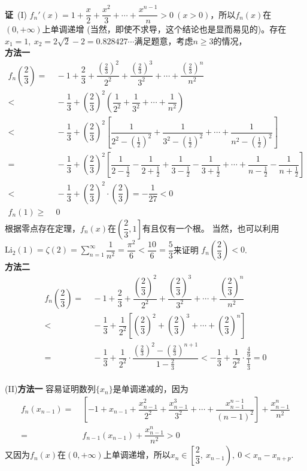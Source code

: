 \begin{enumerate}[label={【\textbf{例\thechapter.\arabic*}】},
 leftmargin=\inteval{\myenumleftmargin}pt,
 itemsep=\inteval{\myenumitempsep}pt,
 itemindent=\inteval{\myenumitemindent}pt]
\textbf{证}\ (I) $ f_n'(x)=1+\dfrac{x}{2}+\dfrac{x^2}{3}+\cdots
+\dfrac{x^{n-1}}{n}>0\ (x>0) $，所以$ f_n(x) $在$ (0,+\infty) $上单调递增
(当然，即使不求导，这个结论也是显而易见的)。存在$ x_1=1,\ 
x_2=2\sqrt{2}-2=0.828427\cdots $满足题意，考虑$ n\geq 3 $的情况，\\
\textbf{方法一}
\begin{align*}
    f_n\left(\dfrac{2}{3}\right)=&\ -1+\dfrac{2}{3}+\dfrac{(\frac{2}{3})^2}{2^2}
    +\dfrac{(\frac{2}{3})^3}{3^2}+\cdots+\dfrac{(\frac{2}{3})^n}{n^2} \\
    <&\ -\dfrac{1}{3}+\left(\dfrac{2}{3}\right)^2\left(\dfrac{1}{2^2}+
    \dfrac{1}{3^2}+\cdots+\dfrac{1}{n^2}\right) \\
    <&\ -\dfrac{1}{3}+\left(\dfrac{2}{3}\right)^2\left[\dfrac{1}{2^2-
        (\frac{1}{2})^2}+\dfrac{1}{3^2-(\frac{1}{2})^2}+\cdots+
    \dfrac{1}{n^2-(\frac{1}{2})^2}\right] \\
    =&\ -\dfrac{1}{3}+\left(\dfrac{2}{3}\right)^2\left[\dfrac{1}{2-
        \frac{1}{2}}-\dfrac{1}{2+\frac{1}{2}}+\dfrac{1}{3-\frac{1}{2}}-
    \dfrac{1}{3+\frac{1}{2}}+\cdots+\dfrac{1}{n-\frac{1}{2}}-
    \dfrac{1}{n+\frac{1}{2}} \right] \\  
    <&\ -\dfrac{1}{3}+\left(\dfrac{2}{3}\right)^2\cdot \left(\dfrac{2}{3}\right)
    =-\dfrac{1}{27}<0 \\
    f_n(1)\geq &\ 0
\end{align*}
根据零点存在定理，$ f_n(x) $在$ \left(\dfrac{2}{3},1\right] $有且仅有一个根。
当然，也可以利用$ \mathrm{Li}_2(1)=\zeta(2)=\sum\limits_{n=1}^{\infty}\dfrac{1}{n^2}=
\dfrac{\pi^2}{6}<\dfrac{10}{6}=\dfrac{5}{3} $来证明
$ f_n\left(\dfrac{2}{3}\right)<0 $. \\
\textbf{方法二} 
\begin{align*}
    f_n\left(\dfrac{2}{3}\right)=&\ -1+\dfrac{2}{3}+\dfrac{(\dfrac{2}{3})^2}{2^2}
    +\dfrac{(\dfrac{2}{3})^3}{3^2}+\cdots+\dfrac{(\dfrac{2}{3})^n}{n^2} \\
    <&\ -\dfrac{1}{3}+\dfrac{1}{2^2}\left[\left(\dfrac{2}{3}\right)^2+
    \left(\dfrac{2}{3}\right)^3+\cdots+\left(\dfrac{2}{3}\right)^n\right] \\
    =&\ -\dfrac{1}{3}+\dfrac{1}{2^2}\cdot \dfrac{\left(\frac{2}{3}\right)^2-
        \left(\frac{2}{3}\right)^{n+1}}{1-\frac{2}{3}} 
    < -\dfrac{1}{3}+\dfrac{1}{2^2}\cdot\dfrac{\frac{4}{9}}{\frac{1}{3}}
    =0 
\end{align*}
\\
(II)\textbf{方法一} 容易证明数列$ \{x_n\} $是单调递减的，因为
\begin{align*}
    f_n(x_{n-1})=&\ \left[-1+x_{n-1}+\dfrac{x_{n-1}^2}{2^2}+
    \dfrac{x_{n-1}^3}{3^2}+\cdots+\dfrac{x_{n-1}^{n-1}}{(n-1)^2}\right]
    +\dfrac{x_{n-1}^n}{n^2}\\=&\ f_{n-1}(x_{n-1})+\dfrac{x_{n-1}^n}{n^2}>0
\end{align*}
又因为$ f_n(x) $在$ (0,+\infty) $上单调递增，所以$ x_n\in\left[\dfrac{2}{3},\ x_{n-1}\right),\ 0<x_n-x_{n+p} $. 


\end{enumerate}
